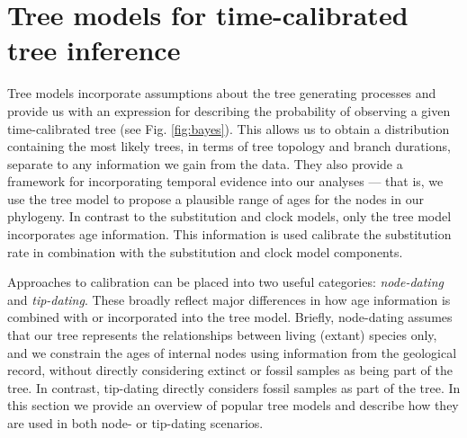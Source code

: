 \section{Tree models for time-calibrated tree inference}


Tree models incorporate assumptions about the tree generating processes and provide us with an expression for describing the probability of observing a given time-calibrated tree (see Fig. \ref{fig:bayes}). This allows us to obtain a distribution containing the most likely trees, in terms of tree topology and branch durations, separate to any information we gain from the  data.
They also provide a framework for incorporating temporal evidence into our analyses --- that is, we use the tree model to propose a plausible range of ages for the nodes in our phylogeny.
In contrast to the substitution and clock models, only the tree model incorporates age information. %
This information is used  calibrate the substitution rate in combination with the substitution and clock model components.

Approaches to calibration can be placed into two useful categories: \textit{node-dating} and \textit{tip-dating}.
These broadly reflect major differences in how age information is combined with or incorporated into the tree model.
Briefly, node-dating assumes that our tree represents the relationships between living (extant) species only, and we constrain the ages of internal nodes using information from the geological record, without directly considering extinct or fossil samples as being part of the tree.
In contrast, tip-dating directly considers fossil samples as part of the tree.
In this section we provide an overview of popular tree models and describe how they are used in both node- or tip-dating scenarios.

